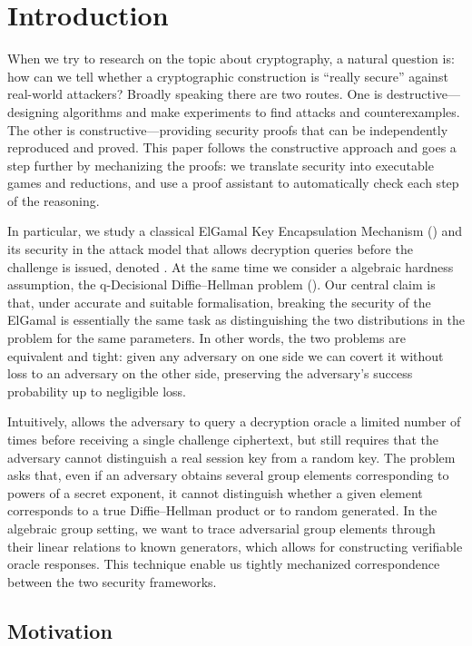 \chapter{Introduction}

When we try to research on the topic about cryptography, a natural question is: how can we tell whether a cryptographic construction is “really secure” against real-world attackers? Broadly speaking there are two routes. One is destructive—designing algorithms and make experiments to find attacks and counterexamples. The other is constructive—providing security proofs that can be independently reproduced and proved. This paper follows the constructive approach and goes a step further by mechanizing the proofs: we translate security into executable games and reductions, and use a proof assistant to automatically check each step of the reasoning.

In particular, we study a classical ElGamal Key Encapsulation Mechanism (\KEM) and its security in the attack model that allows decryption queries before the challenge is issued, denoted \INDCCAone. At the same time we consider a algebraic hardness assumption, the q-Decisional Diffie–Hellman problem (\qDDH). Our central claim is that, under accurate and suitable formalisation, breaking the \INDCCAone security of the ElGamal \KEM is essentially the same task as distinguishing the two distributions in the \qDDH problem for the same parameters. In other words, the two problems are equivalent and tight: given any adversary on one side we can covert it without loss to an adversary on the other side, preserving the adversary’s success probability up to negligible loss.

Intuitively, \INDCCAone allows the adversary to query a decryption oracle a limited number of times before receiving a single challenge ciphertext, but still requires that the adversary cannot distinguish a real session key from a random key. The \qDDH problem asks that, even if an adversary obtains several group elements corresponding to powers of a secret exponent, it cannot distinguish whether a given element corresponds to a true Diffie–Hellman product or to random generated. In the algebraic group setting, we want to trace adversarial group elements through their linear relations to known generators, which allows for constructing verifiable oracle responses. This technique enable us tightly mechanized correspondence between the two security frameworks.


\section{Motivation}



